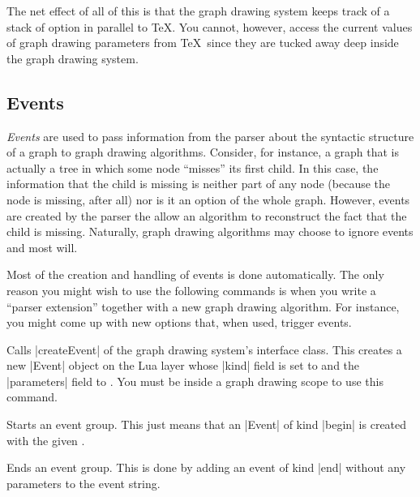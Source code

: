The net effect of all of this is that the graph drawing system keeps
track of a stack of option in parallel to \TeX. You cannot, however,
access the current values of graph drawing parameters from \TeX\ since
they are tucked away deep inside the graph drawing system.



\subsection{Events}

\emph{Events} are used to pass information from the parser about the
syntactic structure of a graph to graph drawing algorithms. Consider,
for instance, a graph that is actually a tree in which some node
``misses'' its first child. In this case, the information that the
child is missing is neither part of any node (because the node is
missing, after all) nor is it an option of the whole graph. However,
events are created by the parser the allow an algorithm to reconstruct
the fact that the child is missing. Naturally, graph drawing
algorithms may choose to ignore events and most will.

Most of the creation and handling of events is done automatically. The
only reason you might wish to use the following commands is when you
write a ``parser extension'' together with a new graph drawing
algorithm. For instance, you might come up with new options that, when
used, trigger events.

\begin{command}{\pgfgdevent{}}
  Calls |createEvent| of the graph drawing system's interface
  class. This creates a new |Event| object on the Lua layer whose
  |kind| field is set to  and the |parameters| field to
  . You must be inside a graph drawing scope to use
  this command. 
\end{command}

\begin{command}{\pgfgdbegineventgroup{}}
  Starts an event group. This just means that an |Event| of kind
  |begin| is created with the given .
\end{command}

\begin{command}{\pgfgdendeventgroup}
  Ends an event group. This is done by adding an event of kind |end|
  without any parameters to the event string.
\end{command}

